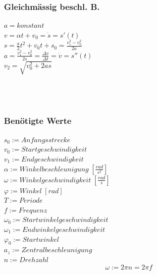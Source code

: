 \begin{multicols}{3}
	\subsubsection{Gleichmässig beschl. B.}
	$a = konstant$ \\
	$v = \alpha t + v_{0} = \dot s = s'(t)$ \\
	$s = \frac{a}{2}t^2 + v_{0}t + s_{0} = \frac{v_{1}^2 - v_{0}^2}{2a}$ \\
	$a = \frac{v_{1}^2 - v_{0}^2}{2s} = \frac{\Delta v}{\Delta t} = \dot v = s''(t)$ \\
	$v_{2} = \sqrt{v_{0}^2 + 2as}$ \\
	\\
	\\
	\\
\columnbreak
	\subsubsection{Benötigte Werte}
	$s_{0}:= Anfangsstrecke$ \\
	$v_{0}:= Startgeschwindigkeit$ \\
	$v_{1}:= Endgeschwindigkeit$ \\
	$\alpha:= Winkelbeschleunigung \; [\frac{rad}{s^2}]$ \\
	$\omega:= Winkelgeschwindigkeit \; [\frac{rad}{s}]$ \\
	$\varphi:= Winkel \; [rad]$ \\
	$T:= Periode $\\
	$f:= Frequenz $\\
	$\omega_{0} := Startwinkelgeschwindigkeit $ \\
	$\omega_{1} := Endwinkelgeschwindigkeit $ \\
	$\varphi_{0} := Startwinkel $ \\
	$a_{z} := Zentralbeschleunigung$ \\
	$n := Drehzahl$
	$$ \omega := 2 \pi n = 2 \pi f$$ \\
\end{multicols}
	
